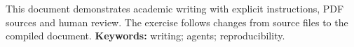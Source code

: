 \begin{resumo}[Abstract]
This document demonstrates academic writing with explicit instructions, PDF sources and human review. The exercise follows changes from source files to the compiled document.
\vspace{\onelineskip}
\noindent\textbf{Keywords:} writing; agents; reproducibility.
\end{resumo}
